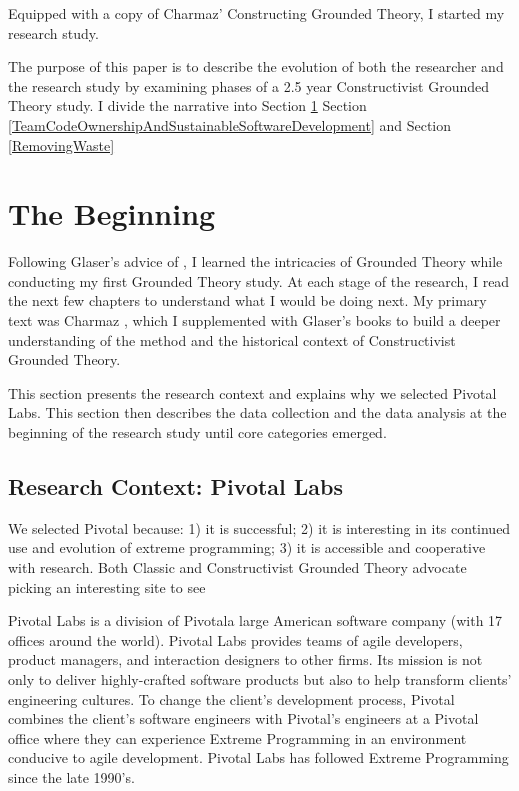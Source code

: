 Equipped with a copy of Charmaz’ Constructing Grounded Theory, I started my research study.

The purpose of this paper is to describe the evolution of both the researcher and the research study by examining phases of a 2.5 year Constructivist Grounded Theory study.  I divide the narrative into Section \ref{TheBeginning}  Section \ref{TeamCodeOwnershipAndSustainableSoftwareDevelopment}  and Section \ref{RemovingWaste} 

\section{The Beginning}
\label{TheBeginning}
Following Glaser’s advice of  \cite{GlaserIssues}, I learned the intricacies of Grounded Theory while conducting my first Grounded Theory study. At each stage of the research, I read the next few chapters to understand what I would be doing next. My primary text was Charmaz \cite{Charmaz}, which I supplemented with Glaser’s books \cite{GlaserDiscovery, GlaserTheoreticalSensitivity, GlaserIssues} to build a deeper understanding of the method and the historical context of Constructivist Grounded Theory. 

This section presents the research context and explains why we selected Pivotal Labs. This section then describes the data collection and the data analysis at the beginning of the research study until core categories emerged.
\subsection{Research Context: Pivotal Labs}
\label{ResearchContext}
We selected Pivotal because: 1) it is successful; 2) it is interesting in its continued use and evolution of extreme programming; 3) it is accessible and cooperative with research. Both Classic and Constructivist Grounded Theory advocate picking an interesting site to see  

Pivotal Labs is a division of Pivotal\textemdash a large American software company (with 17 offices around the world). Pivotal Labs provides teams of agile developers, product managers, and interaction designers to other firms. Its mission is not only to deliver highly-crafted software products but also to help transform clients' engineering cultures. To change the client's development process, Pivotal combines the client's software engineers with Pivotal's engineers at a Pivotal office where they can experience Extreme Programming \cite{BeckExtremeProgramming2004} in an environment conducive to agile development. Pivotal Labs has followed Extreme Programming \cite{BeckExtremeProgramming2004} since the late 1990's. 

